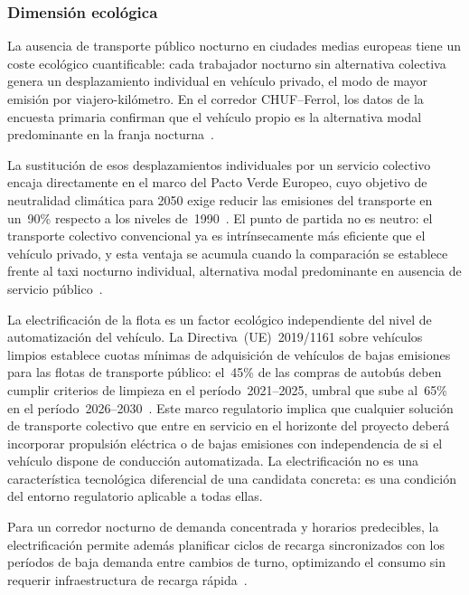 \subsubsection{Dimensión ecológica}
\label{sec:pestel-ecologica}

La ausencia de transporte público nocturno en ciudades medias 
europeas tiene un coste ecológico cuantificable: cada 
trabajador nocturno sin alternativa colectiva genera un 
desplazamiento individual en vehículo privado, el modo de 
mayor emisión por viajero-kilómetro. En el corredor 
CHUF--Ferrol, los datos de la encuesta primaria confirman 
que el vehículo propio es la alternativa modal predominante 
en la franja nocturna~\parencite{LouridoRegueira2026}.

La sustitución de esos desplazamientos individuales por un 
servicio colectivo encaja directamente en el marco del Pacto 
Verde Europeo, cuyo objetivo de neutralidad climática para 
2050 exige reducir las emisiones del transporte en un~90\% 
respecto a los niveles de~1990~\parencite{CE_Movilidad2020}. 
El punto de partida no es neutro: el transporte colectivo 
convencional ya es intrínsecamente más eficiente que el 
vehículo privado, y esta ventaja se acumula cuando la 
comparación se establece frente al taxi nocturno individual, 
alternativa modal predominante en ausencia de servicio 
público~\parencite{UITP2024}.

La electrificación de la flota es un factor ecológico 
independiente del nivel de automatización del vehículo. 
La Directiva~(UE)~2019/1161 sobre vehículos limpios 
establece cuotas mínimas de adquisición de vehículos de 
bajas emisiones para las flotas de transporte público: 
el~45\% de las compras de autobús deben cumplir criterios 
de limpieza en el período~2021--2025, umbral que sube 
al~65\% en el período~2026--2030~\parencite{CVD20191161}. 
Este marco regulatorio implica que cualquier solución de 
transporte colectivo que entre en servicio en el horizonte 
del proyecto deberá incorporar propulsión eléctrica o de 
bajas emisiones con independencia de si el vehículo dispone 
de conducción automatizada. La electrificación no es una 
característica tecnológica diferencial de una candidata 
concreta: es una condición del entorno regulatorio 
aplicable a todas ellas.

Para un corredor nocturno de demanda concentrada y horarios 
predecibles, la electrificación permite además planificar 
ciclos de recarga sincronizados con los períodos de baja 
demanda entre cambios de turno, optimizando el consumo sin 
requerir infraestructura de recarga 
rápida~\parencite{UITP2024}.



